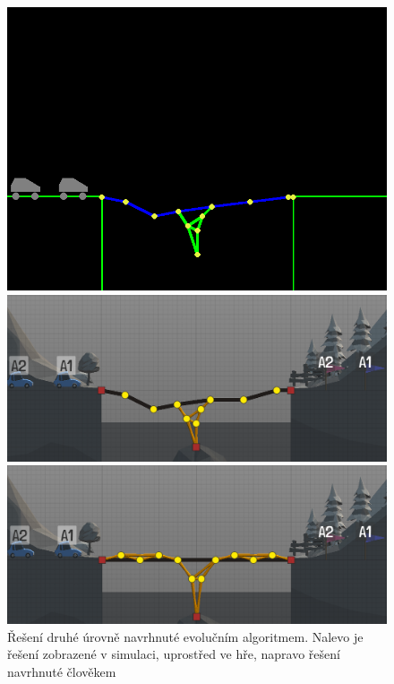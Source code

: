 \begin{figure}[ht]
    \centering
    \begin{minipage}{0.32\textwidth}
        \centering
        \includegraphics[width=\linewidth]{img/lvl2-sim-ea}
    \end{minipage}\hfill
    \begin{minipage}{0.32\textwidth}
        \centering
        \includegraphics[width=\linewidth]{img/lvl2-poly-ea}
    \end{minipage}
    \begin{minipage}{0.32\textwidth}
        \centering
        \includegraphics[width=\linewidth]{img/lvl2-poly-human}
    \end{minipage}
    \caption{Řešení druhé úrovně navrhnuté evolučním algoritmem. Nalevo je řešení zobrazené v simulaci, uprostřed ve hře, napravo řešení navrhnuté člověkem}
    \label{exp:lvl2}
\end{figure}

